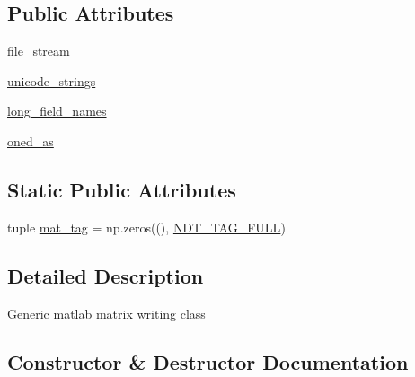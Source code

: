\subsection*{Public Attributes}
\begin{DoxyCompactItemize}
\item 
\hyperlink{classscipy_1_1io_1_1matlab_1_1mio5_1_1VarWriter5_a178553474f2c87e322e5a3ea8852b452}{file\+\_\+stream}
\item 
\hyperlink{classscipy_1_1io_1_1matlab_1_1mio5_1_1VarWriter5_a422aeeb6eabad96e8a9ccb56bd381eaa}{unicode\+\_\+strings}
\item 
\hyperlink{classscipy_1_1io_1_1matlab_1_1mio5_1_1VarWriter5_a481a02db3c7cc8370b26eda256e4b44d}{long\+\_\+field\+\_\+names}
\item 
\hyperlink{classscipy_1_1io_1_1matlab_1_1mio5_1_1VarWriter5_ae067569ee1dba5858a76b1e86249ddc0}{oned\+\_\+as}
\end{DoxyCompactItemize}
\subsection*{Static Public Attributes}
\begin{DoxyCompactItemize}
\item 
tuple \hyperlink{classscipy_1_1io_1_1matlab_1_1mio5_1_1VarWriter5_a87a016d1337549d2b3fa7604c890feb5}{mat\+\_\+tag} = np.\+zeros((), \hyperlink{namespacescipy_1_1io_1_1matlab_1_1mio5_a993ddce5977df6877558bfe56bdc4f55}{N\+D\+T\+\_\+\+T\+A\+G\+\_\+\+F\+U\+L\+L})
\end{DoxyCompactItemize}


\subsection{Detailed Description}
\begin{DoxyVerb}Generic matlab matrix writing class \end{DoxyVerb}
 

\subsection{Constructor \& Destructor Documentation}
\hypertarget{classscipy_1_1io_1_1matlab_1_1mio5_1_1VarWriter5_aca8cbbe73626b27df4eb21552d08d763}{}
